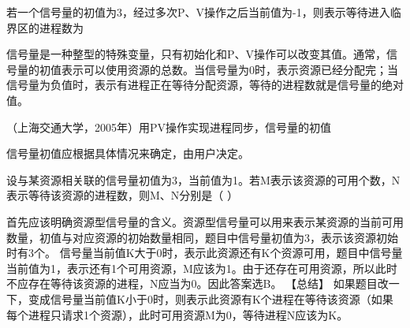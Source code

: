 \question 若一个信号量的初值为3，经过多次P、V操作之后当前值为-1，则表示等待进入临界区的进程数为
\par{}
\begin{solution}信号量是一种整型的特殊变量，只有初始化和P、V操作可以改变其值。通常，信号量的初值表示可以使用资源的总数。当信号量为0时，表示资源已经分配完；当信号量为负值时，表示有进程正在等待分配资源，等待的进程数就是信号量的绝对值。
\end{solution}
\question （上海交通大学，2005年）用PV操作实现进程同步，信号量的初值
\par{}
\begin{solution}信号量初值应根据具体情况来确定，由用户决定。
\end{solution}
\question 设与某资源相关联的信号量初值为3，当前值为1。若M表示该资源的可用个数，N表示等待该资源的进程数，则M、N分别是（
）
\par{}
\begin{solution}首先应该明确资源型信号量的含义。资源型信号量可以用来表示某资源的当前可用数量，初值与对应资源的初始数量相同，题目中信号量初值为3，表示该资源初始时有3个。
信号量当前值K大于0时，表示此资源还有K个资源可用，题目中信号量当前值为1，表示还有1个可用资源，M应该为1。由于还存在可用资源，所以此时不应存在等待该资源的进程，N应当为0。因此答案选B。
【总结】
如果题目改一下，变成信号量当前值K小于0时，则表示此资源有\textbar{}K\textbar{}个进程在等待该资源（如果每个进程只请求1个资源），此时可用资源M为0，等待进程N应该为\textbar{}K\textbar{}。
\end{solution}
